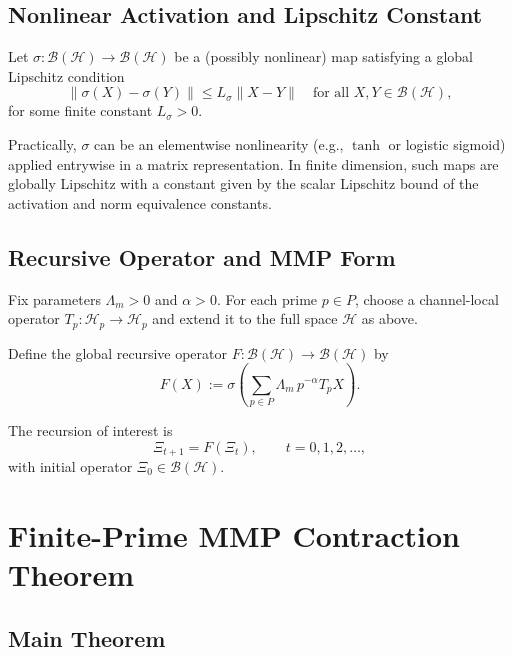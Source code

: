 \documentclass[12pt]{article}
\begin{document}
\subsection{Nonlinear Activation and Lipschitz Constant}

Let \(\sigma:\mathcal{B}(\mathcal{H})\to\mathcal{B}(\mathcal{H})\) be a (possibly nonlinear) map satisfying a global Lipschitz condition
\[
  \|\sigma(X) - \sigma(Y)\|
  \le
  L_\sigma \|X-Y\|
  \quad \text{for all } X,Y\in \mathcal{B}(\mathcal{H}),
\]
for some finite constant \(L_\sigma>0\).

Practically, \(\sigma\) can be an elementwise nonlinearity (e.g., \(\tanh\) or logistic sigmoid) applied entrywise in a matrix representation. In finite dimension, such maps are globally Lipschitz with a constant given by the scalar Lipschitz bound of the activation and norm equivalence constants.

\subsection{Recursive Operator and MMP Form}

Fix parameters \(\Lambda_m > 0\) and \(\alpha > 0\). For each prime \(p\in P\), choose a channel-local operator \(T_p:\mathcal{H}_p\to\mathcal{H}_p\) and extend it to the full space \(\mathcal{H}\) as above.

Define the global recursive operator \(F:\mathcal{B}(\mathcal{H})\to\mathcal{B}(\mathcal{H})\) by
\begin{equation}
  F(X)
  :=
  \sigma\!\left(
    \sum_{p\in P} \Lambda_m\,p^{-\alpha} T_p X
  \right).
  \label{eq:F-definition}
\end{equation}

The recursion of interest is
\begin{equation}
  \Xi_{t+1}
  =
  F(\Xi_t),
  \qquad t=0,1,2,\dots,
  \label{eq:Xi-recursion}
\end{equation}
with initial operator \(\Xi_0\in\mathcal{B}(\mathcal{H})\).

\newpage

\section{Finite-Prime MMP Contraction Theorem}

\subsection{Main Theorem}
\end{document}
